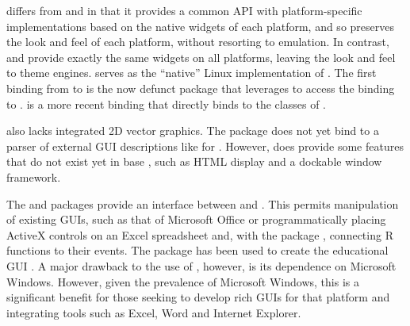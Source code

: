 \documentclass[article]{jss}
\begin{document}
 \citep{wxwidgets} differs from  and
 in that it provides a common API with platform-specific
implementations based on the native widgets of each platform, and so 
preserves the look and feel of each platform, without
resorting to emulation.  In contrast,  and 
provide exactly the same widgets on all platforms, leaving the look
and feel to theme engines.   serves as the ``native'' Linux
implementation of .  The first binding from
 to  is the now defunct 
package that leverages  to access the 
binding to .   \citep{RwxWidgets} is a
more recent binding that directly binds to the  classes
of . 

 also lacks integrated 2D vector graphics. The
 package does not yet bind to a parser of external GUI descriptions like  for .
However,  does provide some features that
do not exist yet in base , such as HTML display and a
dockable window framework.

The  \citep{RDCOM} and  \citep{RDCOM2}
packages provide an interface between  and 
\citep{DCOM}. This permits manipulation of existing GUIs, such as that
of Microsoft Office or programmatically placing ActiveX controls on an
Excel spreadsheet and, with the  package \citep{RDCOMEvents}, connecting R functions to their events.
 The
 package has been used to create the educational
 GUI  \citep{simpleR}. A major drawback to
the use of , however, is its dependence on Microsoft
Windows. However, given the prevalence of Microsoft Windows, this is a
significant benefit for those seeking to develop rich GUIs for that
platform and integrating tools such as Excel, Word and Internet
Explorer.
\end{document}
